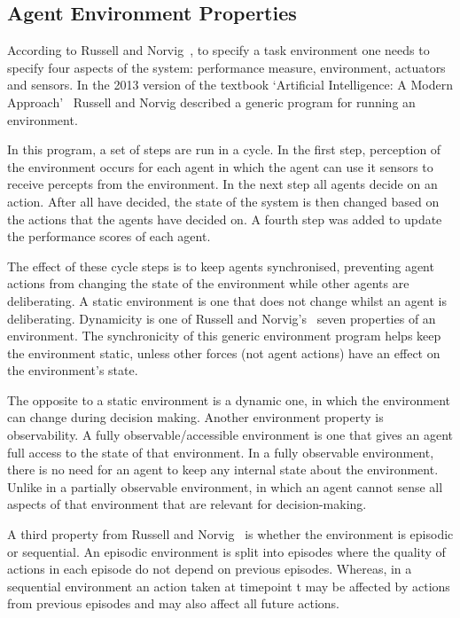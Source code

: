 \documentclass[]{final_report}
\begin{document}
\subsection{Agent Environment Properties}
\label{appendix:agentenvprop}
According to Russell and Norvig~\cite{russell2016artificial}, to specify a task environment one needs to specify four aspects of the system: performance measure, environment, actuators and sensors. In the 2013 version of the textbook `Artificial Intelligence: A Modern Approach'~\cite{russell2011artificial} Russell and Norvig described a generic program for running an environment.\par 
In this program, a set of steps are run in a cycle. In the first step, perception of the environment occurs for each agent in which the agent can use it sensors to receive percepts from the environment. In the next step all agents decide on an action. After all have decided, the state of the system is then changed based on the actions that the agents have decided on. A fourth step was added to update the performance scores of each agent.\par 
The effect of these cycle steps is to keep agents synchronised, preventing agent actions from changing the state of the environment while other agents are deliberating. A static environment is one that does not change whilst an agent is deliberating. Dynamicity is one of Russell and Norvig's~\cite{russell2016artificial} seven properties of an environment. The synchronicity of this generic environment program helps keep the environment static, unless other forces (not agent actions) have an effect on the environment's state.\par 
The opposite to a static environment is a dynamic one, in which the environment can change during decision making. Another environment property is observability. A fully observable/accessible environment is one that gives an agent full access to the state of that environment. In a fully observable environment, there is no need for an agent to keep any internal state about the environment. Unlike in a partially observable environment, in which an agent cannot sense all aspects of that environment that are relevant for decision-making.\par 
A third property from Russell and Norvig~\cite{russell2016artificial} is whether the environment is episodic or sequential. An episodic environment is split into episodes where the quality of actions in each episode do not depend on previous episodes. Whereas, in a sequential environment an action taken at timepoint t may be affected by actions from previous episodes and may also affect all future actions.\par 
\end{document}
